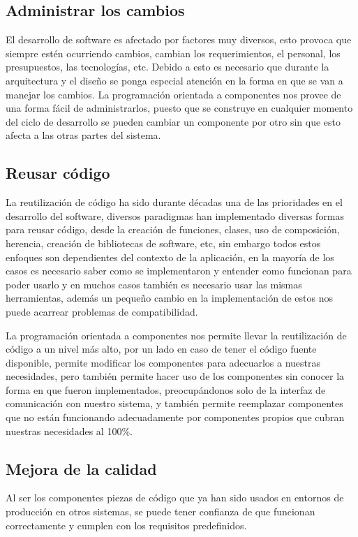 \documentclass[12pt,a4paper,spanish,openany]{book}
\begin{document}
\subsection{Administrar los cambios}

El desarrollo de software es afectado por factores muy diversos, esto provoca
que siempre estén ocurriendo cambios, cambian los requerimientos, el
personal, los presupuestos, las tecnologías, etc. Debido a esto es necesario que
durante la arquitectura y el diseño se ponga especial atención en la forma en
que se van a manejar los cambios. La programación orientada a componentes nos
provee de una forma fácil de administrarlos, puesto que se construye en cualquier
momento del ciclo de desarrollo se pueden cambiar un componente por otro
sin que esto afecta a las otras partes del sistema.

\subsection{Reusar código}

La reutilización de código ha sido durante décadas una de las prioridades en el
desarrollo del software, diversos paradigmas han implementado diversas formas
para reusar código, desde la creación de funciones, clases,  uso de composición,
herencia, creación de bibliotecas de software, etc, sin embargo todos estos
enfoques son dependientes del contexto de la aplicación, en la mayoría de los
casos es necesario saber como se implementaron y entender como funcionan para
poder usarlo y en muchos casos también es necesario usar las mismas
herramientas, además un pequeño cambio en la implementación de estos nos
puede acarrear problemas de compatibilidad.

La programación orientada a componentes nos permite llevar la reutilización de
código a un nivel más alto, por un lado en caso de tener el código fuente
disponible, permite modificar los componentes para adecuarlos a nuestras
necesidades, pero también permite hacer uso de los componentes sin conocer la
forma en que fueron implementados,   preocupándonos solo de la interfaz de
comunicación con nuestro sistema, y también permite reemplazar componentes que
no están funcionando adecuadamente por componentes propios que cubran nuestras
necesidades al 100\%.

\subsection{Mejora de la calidad}
Al ser los componentes piezas de código que ya han sido usados en entornos de
producción en otros sistemas, se puede tener confianza de que funcionan
correctamente y cumplen con los requisitos predefinidos.
\end{document}
